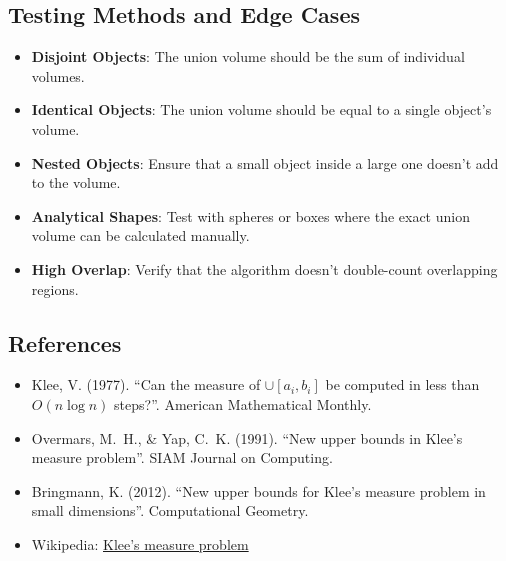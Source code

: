 \subsection{Testing Methods and Edge Cases}
\begin{itemize}
    \item \textbf{Disjoint Objects}: The union volume should be the sum of individual volumes.
    \item \textbf{Identical Objects}: The union volume should be equal to a single object's volume.
    \item \textbf{Nested Objects}: Ensure that a small object inside a large one doesn't add to the volume.
    \item \textbf{Analytical Shapes}: Test with spheres or boxes where the exact union volume can be calculated manually.
    \item \textbf{High Overlap}: Verify that the algorithm doesn't double-count overlapping regions.
\end{itemize}

\subsection{References}
\begin{itemize}
    \item Klee, V. (1977). ``Can the measure of $\cup [a_i, b_i]$ be computed in less than $O(n \log n)$ steps?''. American Mathematical Monthly.
    \item Overmars, M.~H., \& Yap, C.~K. (1991). ``New upper bounds in Klee's measure problem''. SIAM Journal on Computing.
    \item Bringmann, K. (2012). ``New upper bounds for Klee's measure problem in small dimensions''. Computational Geometry.
    \item Wikipedia: \href{https://en.wikipedia.org/wiki/Klee's_measure_problem}{Klee's measure problem}
\end{itemize}
